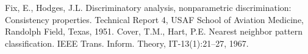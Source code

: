 \documentclass[conference]{IEEEtran}
\begin{document}
\begin{thebibliography}{00}
 Fix, E., Hodges, J.L. Discriminatory analysis, nonparametric discrimination: Consistency properties. Technical Report 4, USAF School of Aviation Medicine, Randolph Field, Texas, 1951.
 Cover, T.M., Hart, P.E. Nearest neighbor pattern classification. IEEE Trans. Inform. Theory, IT-13(1):21–27, 1967.
\end{thebibliography}
\end{document}
